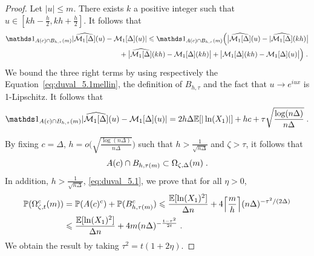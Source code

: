 \begin{proof}
Let $|u| \leq m$. There exists $k$ a positive integer such that $u \in [kh - \frac{h}{2}, kh + \frac{h}{2}]$. It follows that 
    \begin{equation*}
    \begin{split}
        \ind{A(c) \cap B_{h, \tau}(m)} |\hat{\Mcal_1[\Delta]}(u) &- \Mcal_1[\Delta](u) |
        \leq \ind{A(c) \cap B_{h, \tau}(m)} \Big( \big|\hat{\Mcal_1[\Delta]}(u) - |\hat{\Mcal_1[\Delta]}(kh) \big|  \\
        &\qquad +  \big| \hat{\Mcal_1[\Delta]}(kh) - \Mcal_1[\Delta](kh) \big| + \big| \Mcal_1[\Delta](kh) -  \Mcal_1[\Delta](u) \big| \Big)
        \eqfinp
    \end{split}
    \end{equation*}
We bound the three right terms by using respectively the Equation~\eqref{eq:duval_5.1mellin}, the definition of $B_{h, \tau}$ and the fact that $u \to e^{iux}$ is 1-Lipschitz. It follows that 
    \begin{equation*}
        \ind{A(c) \cap B_{h, \tau}(m)} |\hat{\Mcal_1[\Delta]}(u) - \Mcal_1[\Delta](u) |
        = 
        2 h \Delta \EE[|\ln(X_1)|] + hc +  \tau \sqrt{\frac{\log(n \Delta)}{n \Delta}}
        \eqfinp
    \end{equation*}

By fixing $c = \Delta$,  $h = o \Big( \sqrt{\frac{\log(n\Delta)}{n\Delta}} \Big)$ such that $h > \frac{1}{\sqrt{n\Delta}}$ and $\zeta > \tau$, it follows that
    \begin{equation*}
        A(c) \cap B_{h, \tau(m)} \subset \Omega_{\zeta, \Delta}(m)
        \; .
    \end{equation*}
In addition, $h > \frac{1}{\sqrt{n \Delta}}$, \eqref{eq:duval_5.1}, we prove that for all 
$\eta > 0$, 
    \begin{align*}
        \mathbb{P}(\Omega_{\zeta, t}^c(m)) 
        &= 
        \mathbb{P}(A(c)^c) +  \mathbb{P}(B_{h, \tau(m)}^c)  
        \leqslant \frac{\mathbb{E}[\ln(X_1)^2]}{\Delta n} + 4 \Big\lceil \frac{m}{h} \Big\rceil (n \Delta)^{-\tau^2 / (2 \Delta)} \\
        &\leqslant \frac{\mathbb{E}[\ln(X_1)^2]}{\Delta n} + 4 m (n \Delta)^{- \frac{t - \tau^2}{2 t}}
        \; .
    \end{align*}
We obtain the result by taking $\tau^2 = t(1 + 2\eta)$.
\end{proof}

